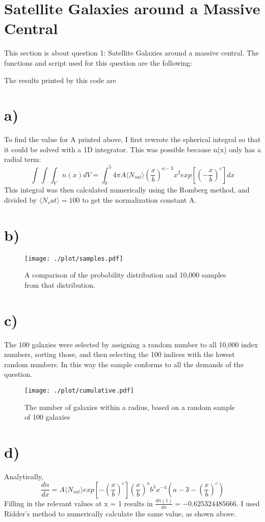 \section{Satellite Galaxies around a Massive Central}
This section is about question 1: Satellite Galaxies around a massive central.
The functions and script used for this question are the following:

The results printed by this code are 

\section*{a)}
To find the value for A printed above, I first rewrote the spherical integral so that it could be solved with a 1D integrator. This was possible because n(x) only has a radial term:
\begin{equation}
    \int\int\int_Vn(x)dV = \int_0^5 4\pi A\langle N_{sat}\rangle \left(\frac{x}{b}\right)^{a-3}x^2exp \left[  \left(-\frac {x}{b} \right) ^c \right]dx
\end{equation}
This integral was then calculated numerically using the Romberg method, and divided by $\langle N_sat\rangle=100$ to get the normalization constant A.
\section*{b)}
\begin{figure}[!h]
    \centering
    \texttt{[image: ./plot/samples.pdf]}
    \caption{A comparison of the probability distribution and 10,000 samples from that distribution.}
    \label{fig:samples}
\end{figure}
\section*{c)}
The 100 galaxies were selected by assigning a random number to all 10,000 index numbers, sorting those, and then selecting the 100 indices with the lowest random numbers. In this way the sample conforms to all the demands of the question.
\begin{figure}[h!]
    \centering
    \texttt{[image: ./plot/cumulative.pdf]}
    \caption{The number of galaxies within a radius, based on a random sample of 100 galaxies}
    \label{fig:cumulative}
\end{figure}
\section*{d)}
Analytically, 
\begin{equation}
    \frac{dn}{dx} = A \langle N_{sat}\rangle exp \left[ - \left( \frac{x}{b} \right) ^c \right] \left( \frac{x}{b} \right) ^a b^{3} x^{-4} ( a - 3- \left( \frac{x}{b} \right) ^c )
\end{equation}
Filling in the relevant values at x = 1 results in $\frac{dn(1)}{dx} = -0.625324485666$. I used Ridder's method to numerically calculate the same value, as shown above.